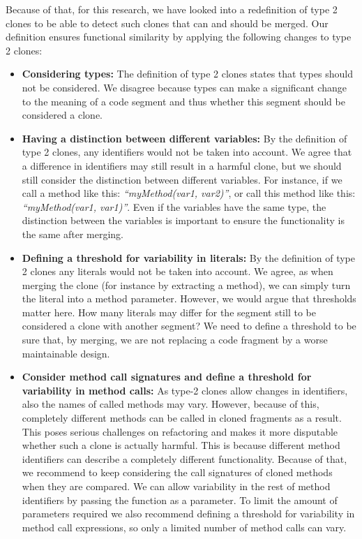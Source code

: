 \documentclass[a4paper]{article}
\begin{document}
Because of that, for this research, we have looked into a redefinition of type 2 clones to be able to detect such clones that can and should be merged. Our definition ensures functional similarity by applying the following changes to type 2 clones:

\begin{itemize}
  \item \textbf{Considering types:} The definition of type 2 clones states that types should not be considered. We disagree because types can make a significant change to the meaning of a code segment and thus whether this segment should be considered a clone.
  \item \textbf{Having a distinction between different variables:} By the definition of type 2 clones, any identifiers would not be taken into account. We agree that a difference in identifiers may still result in a harmful clone, but we should still consider the distinction between different variables. For instance, if we call a method like this: \textit{``myMethod(var1, var2)''}, or call this method like this: \textit{``myMethod(var1, var1)''}. Even if the variables have the same type, the distinction between the variables is important to ensure the functionality is the same after merging.
  \item \textbf{Defining a threshold for variability in literals:} By the definition of type 2 clones any literals would not be taken into account. We agree, as when merging the clone (for instance by extracting a method), we can simply turn the literal into a method parameter. However, we would argue that thresholds matter here. How many literals may differ for the segment still to be considered a clone with another segment? We need to define a threshold to be sure that, by merging, we are not replacing a code fragment by a worse maintainable design.
  \item \textbf{Consider method call signatures and define a threshold for variability in method calls:} As type-2 clones allow changes in identifiers, also the names of called methods may vary. However, because of this, completely different methods can be called in cloned fragments as a result. This poses serious challenges on refactoring and makes it more disputable whether such a clone is actually harmful. This is because different method identifiers can describe a completely different functionality. Because of that, we recommend to keep considering the call signatures of cloned methods when they are compared. We can allow variability in the rest of method identifiers by passing the function as a parameter. To limit the amount of parameters required we also recommend defining a threshold for variability in method call expressions, so only a limited number of method calls can vary.
\end{itemize}
\end{document}
